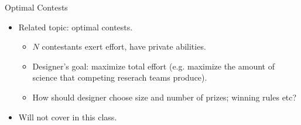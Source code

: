 \documentclass[english,10pt
,aspectratio=169
]{beamer}
\begin{document}
\begin{frame}{Optimal Contests}
\begin{itemize}
	\item Related topic: optimal contests.
	\begin{itemize}
		\item $N$ contestants exert effort, have private abilities.
		\item Designer's goal: maximize total effort (e.g. maximize the amount of science that competing reserach teams produce).
		\item How should designer choose size and number of prizes; winning rules etc? 
	\end{itemize}
	\item Will not cover in this class.
\end{itemize}
\end{frame}
\end{document}
